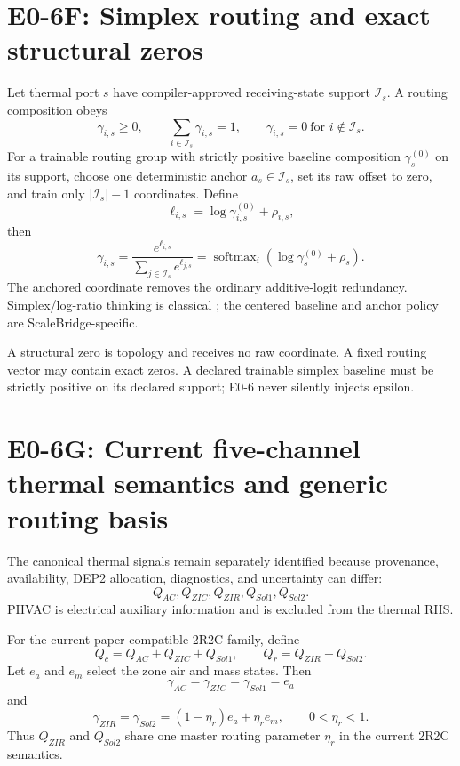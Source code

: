 \documentclass[11pt]{article}
\newcommand{\softmax}{\operatorname{softmax}}
\begin{document}
\section{E0-6F: Simplex routing and exact structural zeros}

Let thermal port $s$ have compiler-approved receiving-state support
$\mathcal I_s$. A routing composition obeys
\[
\gamma_{i,s}\ge0,\qquad
\sum_{i\in\mathcal I_s}\gamma_{i,s}=1,
\qquad
\gamma_{i,s}=0\ \text{for }i\notin\mathcal I_s.
\]
For a trainable routing group with strictly positive baseline composition
$\gamma_s^{(0)}$ on its support, choose one deterministic anchor
$a_s\in\mathcal I_s$, set its raw offset to zero, and train only
$|\mathcal I_s|-1$ coordinates. Define
\[
\ell_{i,s}=\log\gamma_{i,s}^{(0)}+\rho_{i,s},
\]
then
\[
\boxed{
\gamma_{i,s}=
\frac{e^{\ell_{i,s}}}{\sum_{j\in\mathcal I_s}e^{\ell_{j,s}}}
=\softmax_i(\log\gamma_s^{(0)}+\rho_s).
}
\]
The anchored coordinate removes the ordinary additive-logit redundancy.
Simplex/log-ratio thinking is classical \cite{Aitchison1982Compositional}; the
centered baseline and anchor policy are ScaleBridge-specific.

A structural zero is topology and receives no raw coordinate. A fixed routing
vector may contain exact zeros. A declared trainable simplex baseline must be
strictly positive on its declared support; E0-6 never silently injects epsilon.

\section{E0-6G: Current five-channel thermal semantics and generic routing basis}

The canonical thermal signals remain separately identified because provenance,
availability, DEP2 allocation, diagnostics, and uncertainty can differ:
\[
\boxed{Q_{AC},Q_{ZIC},Q_{ZIR},Q_{Sol1},Q_{Sol2}.}
\]
PHVAC is electrical auxiliary information and is excluded from the thermal RHS.

For the current paper-compatible 2R2C family, define
\[
\boxed{Q_c=Q_{AC}+Q_{ZIC}+Q_{Sol1}},
\qquad
\boxed{Q_r=Q_{ZIR}+Q_{Sol2}}.
\]
Let $e_a$ and $e_m$ select the zone air and mass states. Then
\[
\boxed{
\gamma_{AC}=\gamma_{ZIC}=\gamma_{Sol1}=e_a
}
\]
and
\[
\boxed{
\gamma_{ZIR}=\gamma_{Sol2}=(1-\eta_r)e_a+\eta_r e_m,
\qquad 0<\eta_r<1.
}
\]
Thus $Q_{ZIR}$ and $Q_{Sol2}$ share one master routing parameter $\eta_r$ in the
current 2R2C semantics.
\end{document}
